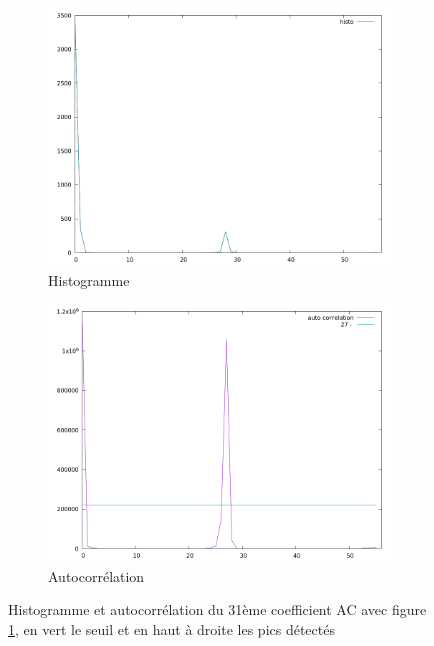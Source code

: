 \documentclass[utf8,final]{stageM2R} %
\begin{document}
\begin{figure}
  \begin{subfigure}{.5\textwidth}
    \centering
    \includegraphics[width=\linewidth]{images/histos/histo31}
    \caption{Histogramme}
  \end{subfigure}
  \begin{subfigure}{.5\textwidth}
    \centering
    \includegraphics[width=\linewidth]{images/histos/autocorrelation31}
    \caption{Autocorrélation}
    \label{fig:histo31_auto}
  \end{subfigure}
  \caption{Histogramme et autocorrélation du 31ème coefficient AC avec figure \ref{fig:histo31_auto}, en vert le seuil et en haut à droite les pics détectés}
  \label{fig:histo31}
\end{figure}
\end{document}
